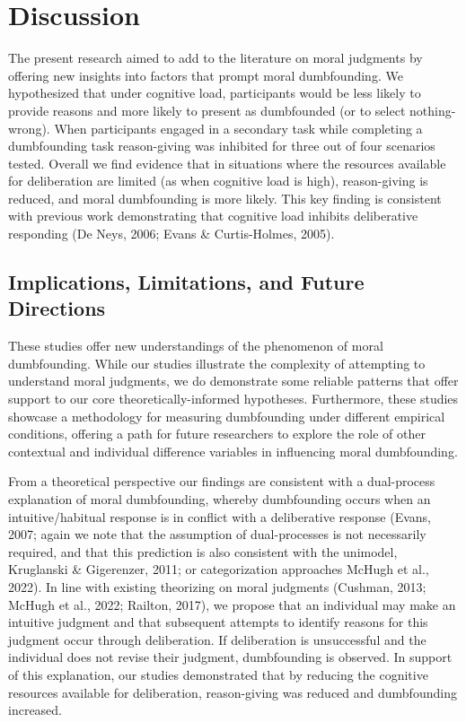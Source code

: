 \documentclass[
  american,
  man,floatsintext]{apa7}
\begin{document}
\newpage

\hypertarget{discussion}{%
\section{Discussion}\label{discussion}}

The present research aimed to add to the literature on moral judgments by offering new insights into factors that prompt moral dumbfounding. We hypothesized that under cognitive load, participants would be less likely to provide reasons and more likely to present as dumbfounded (or to select nothing-wrong). When participants engaged in a secondary task while completing a dumbfounding task reason-giving was inhibited for three out of four scenarios tested. Overall we find evidence that in situations where the resources available for deliberation are limited (as when cognitive load is high), reason-giving is reduced, and moral dumbfounding is more likely. This key finding is consistent with previous work demonstrating that cognitive load inhibits deliberative responding (De Neys, 2006; Evans \& Curtis-Holmes, 2005).

\hypertarget{implications-limitations-and-future-directions}{%
\subsection{Implications, Limitations, and Future Directions}\label{implications-limitations-and-future-directions}}

These studies offer new understandings of the phenomenon of moral dumbfounding. While our studies illustrate the complexity of attempting to understand moral judgments, we do demonstrate some reliable patterns that offer support to our core theoretically-informed hypotheses. Furthermore, these studies showcase a methodology for measuring dumbfounding under different empirical conditions, offering a path for future researchers to explore the role of other contextual and individual difference variables in influencing moral dumbfounding.

From a theoretical perspective our findings are consistent with a dual-process explanation of moral dumbfounding, whereby dumbfounding occurs when an intuitive/habitual response is in conflict with a deliberative response (Evans, 2007; again we note that the assumption of dual-processes is not necessarily required, and that this prediction is also consistent with the unimodel, Kruglanski \& Gigerenzer, 2011; or categorization approaches McHugh et al., 2022). In line with existing theorizing on moral judgments (Cushman, 2013; McHugh et al., 2022; Railton, 2017), we propose that an individual may make an intuitive judgment and that subsequent attempts to identify reasons for this judgment occur through deliberation. If deliberation is unsuccessful and the individual does not revise their judgment, dumbfounding is observed. In support of this explanation, our studies demonstrated that by reducing the cognitive resources available for deliberation, reason-giving was reduced and dumbfounding increased.
\end{document}
